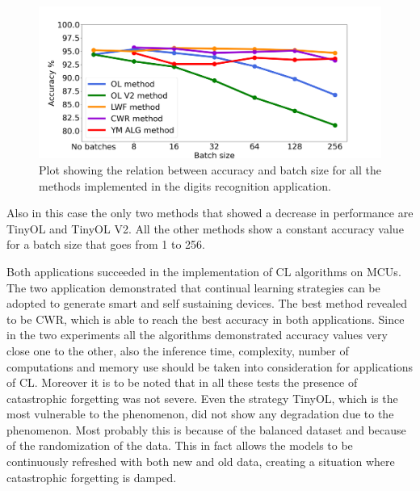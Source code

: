 \documentclass[12pt]{report}
\begin{document}
\begin{figure}[h!]
    \centering
    \includegraphics[width=140mm]{Figures/Chapter5/batch_size_openmv.png} 
    \caption{Plot showing the relation between accuracy and batch size for all the methods implemented in the digits recognition application.}
    \label{fig:openmv_batch_size}    
\end{figure}

Also in this case the only two methods that showed a decrease in performance are TinyOL and TinyOL V2. All the other methods show a constant accuracy value for a batch size that goes from 1 to 256.
\bigskip

Both applications succeeded in the implementation of CL algorithms on MCUs. The two application demonstrated that continual learning strategies can be adopted to generate smart and self sustaining devices. The best method revealed to be CWR, which is able to reach the best accuracy in both applications. Since in the two experiments all the algorithms demonstrated accuracy values very close one to the other, also the inference time, complexity, number of computations and memory use should be taken into consideration for applications of CL. Moreover it is to be noted that in all these tests the presence of catastrophic forgetting was not severe. Even the strategy TinyOL, which is the most vulnerable to the phenomenon, did not show any degradation due to the phenomenon. Most probably this is because of the balanced dataset and because of the randomization of the data. This in fact allows the models to be continuously refreshed with both new and old data, creating a situation where catastrophic forgetting is damped.
\end{document}
